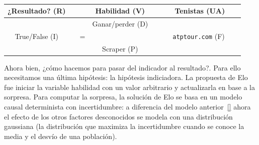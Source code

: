 \documentclass[a4paper,10pt]{book}
\theoremstyle{definition}
\begin{document}

\begin{table}[ht!]
\centering
\begin{tabular}{clcccc}
¿Resultado? (R) & \multicolumn{1}{r|}{} &  & Habilidad (V) &  &  \multicolumn{1}{|c}{Tenistas (UA)} \\ \hline
   &  \multicolumn{1}{r|}{}    &  & Ganar/perder (D) &  & \multicolumn{1}{|r}{} \\
                 True/False (I)  &   & =  &  &  & \ \ \ \texttt{atptour.com} (F) \ \ \  \\
 & \multicolumn{1}{r|}{} &  & Scraper (P) &        &      \multicolumn{1}{|r}{}
\end{tabular}
\caption{}
\label{tab:operacionalizacion_habilidad}
\end{table}


Ahora bien, ¿cómo hacemos para pasar del indicador al resultado?.
Para ello necesitamos una última hipótesis: la hipótesis indiciadora.
La propuesta de Elo fue iniciar la variable habilidad con un valor arbitrario y actualizarla en base a la sorpresa.
Para computar la sorpresa, la solución de Elo se basa en un modelo causal determinista con incertidumbre: a diferencia del modelo anterior~\ref{} ahora el efecto de los otros factores desconocidos se modela con una distribución gaussiana (la distribución que maximiza la incertidumbre cuando se conoce la media y el desvío de una población).

%
\end{document}

